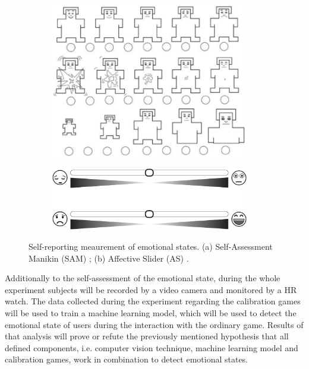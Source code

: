 \begin{figure}[h]
\centering
  \begin{subfigure}[b]{0.5\textwidth}
    \includegraphics[width=0.95\textwidth]{figures/SAM.png}
    \caption{}
    \label{fig:sam}
  \end{subfigure}%
  \begin{subfigure}[b]{0.5\textwidth}
    \centering
    \includegraphics[width=0.95\textwidth]{figures/AS.png}
    \caption{}
    \label{fig:as}
  \end{subfigure}
  \caption{Self-reporting meaurement of emotional states. (a) Self-Assessment Manikin (SAM) \parencite{morris1995observations}; (b) Affective Slider (AS) \parencite{betella2016affective}.}
  \label{fig:sam-as}
\end{figure}

Additionally to the self-assessment of the emotional state, during the whole experiment subjects will be recorded by a video camera and monitored by a HR watch. The data collected during the experiment regarding the calibration games will be used to train a machine learning model, which will be used to detect the emotional state of users during the interaction with the ordinary game. Results of that analysis will prove or refute the previously mentioned hypothesis that all defined components, i.e. computer vision technique, machine learning model and calibration games, work in combination to detect emotional states.

